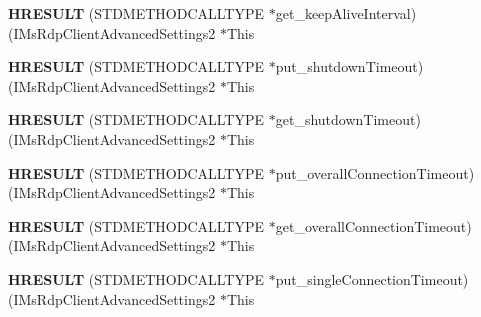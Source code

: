 \begin{DoxyCompactItemize}
\item 
\mbox{\label{struct_i_ms_rdp_client_advanced_settings2_vtbl_a25ccd720a84fcc693f31b94e1bc4da46}} 
{\bfseries H\+R\+E\+S\+U\+LT} (S\+T\+D\+M\+E\+T\+H\+O\+D\+C\+A\+L\+L\+T\+Y\+PE $\ast$get\+\_\+keep\+Alive\+Interval)(I\+Ms\+Rdp\+Client\+Advanced\+Settings2 $\ast$This
\item 
\mbox{\label{struct_i_ms_rdp_client_advanced_settings2_vtbl_af52b9627878a8a1e38111ea6cbfd7a3a}} 
{\bfseries H\+R\+E\+S\+U\+LT} (S\+T\+D\+M\+E\+T\+H\+O\+D\+C\+A\+L\+L\+T\+Y\+PE $\ast$put\+\_\+shutdown\+Timeout)(I\+Ms\+Rdp\+Client\+Advanced\+Settings2 $\ast$This
\item 
\mbox{\label{struct_i_ms_rdp_client_advanced_settings2_vtbl_ae17cf566382f1267ff0b9d8b6699b18f}} 
{\bfseries H\+R\+E\+S\+U\+LT} (S\+T\+D\+M\+E\+T\+H\+O\+D\+C\+A\+L\+L\+T\+Y\+PE $\ast$get\+\_\+shutdown\+Timeout)(I\+Ms\+Rdp\+Client\+Advanced\+Settings2 $\ast$This
\item 
\mbox{\label{struct_i_ms_rdp_client_advanced_settings2_vtbl_ae7d5b55a357faa9bd86cde51e6e61019}} 
{\bfseries H\+R\+E\+S\+U\+LT} (S\+T\+D\+M\+E\+T\+H\+O\+D\+C\+A\+L\+L\+T\+Y\+PE $\ast$put\+\_\+overall\+Connection\+Timeout)(I\+Ms\+Rdp\+Client\+Advanced\+Settings2 $\ast$This
\item 
\mbox{\label{struct_i_ms_rdp_client_advanced_settings2_vtbl_a1b2ad5e6214479768d61105fa1b1336f}} 
{\bfseries H\+R\+E\+S\+U\+LT} (S\+T\+D\+M\+E\+T\+H\+O\+D\+C\+A\+L\+L\+T\+Y\+PE $\ast$get\+\_\+overall\+Connection\+Timeout)(I\+Ms\+Rdp\+Client\+Advanced\+Settings2 $\ast$This
\item 
\mbox{\label{struct_i_ms_rdp_client_advanced_settings2_vtbl_acb03f125a15328c43f05ab8ff1953710}} 
{\bfseries H\+R\+E\+S\+U\+LT} (S\+T\+D\+M\+E\+T\+H\+O\+D\+C\+A\+L\+L\+T\+Y\+PE $\ast$put\+\_\+single\+Connection\+Timeout)(I\+Ms\+Rdp\+Client\+Advanced\+Settings2 $\ast$This
\item 
\mbox{\label{struct_i_ms_rdp_client_advanced_settings2_vtbl_ac38b4102e99017bad5f4702a009e026b}} 

\end{DoxyCompactItemize}
